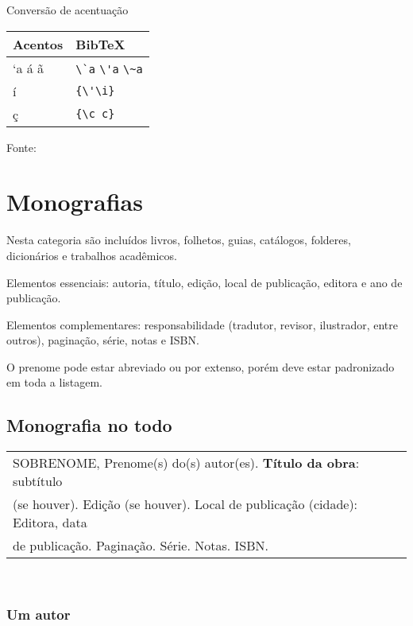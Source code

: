 \begin{quadro}[H]
	\caption{\label{quadro-acentos}Conversão de acentuação}
		\begin{tabular}{|p{7.5cm}|p{7.5cm}|}
			\hline
			\textbf{Acentos} & \textbf{BibTeX}\\
			\hline
			`a \'a ã & \verb+\`a+ \verb+\'a+ \verb+\~a+\\
			\hline
			í & \verb+{\'\i}+\\
			\hline
			ç & \verb+{\c c}+\\
			\hline
		\end{tabular}
		\begin{flushleft}
			Fonte: 
		\end{flushleft}	
\end{quadro}


\section{Monografias}

Nesta categoria são incluídos livros, folhetos, guias, cat\'alogos, folderes, dicion\'arios e trabalhos acad\^emicos.

Elementos essenciais: autoria, título, edição, local de publicação, editora e ano de publicação.

Elementos complementares: responsabilidade (tradutor, revisor, ilustrador, entre outros), paginação, s\'erie, notas e ISBN.

O prenome pode estar abreviado ou por extenso, por\'em deve estar padronizado em toda a listagem. \\

\subsection{Monografia no todo}

\begin{tabular}{|l|c|} \hline
SOBRENOME, Prenome(s) do(s) autor(es). \textbf{Título da obra}: subtítulo \\ (se houver). Edição (se houver). Local de publicação (cidade):	Editora, data \\
de publicação.  Paginação. S\'erie. Notas. ISBN.\\\hline
\end{tabular}\\

\subsubsection{Um autor}

